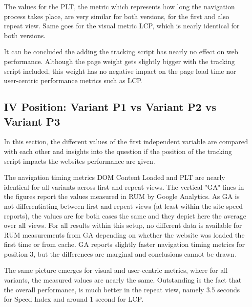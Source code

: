 
The values for the PLT, the metric which represents how long the navigation process takes place, are very similar for both versions, for the first and also repeat view.
Same goes for the visual metric LCP, which is nearly identical for both versions.



It can be concluded the adding the tracking script has nearly no effect on web performance.
Although the page weight gets slightly bigger with the tracking script included, this weight has no negative impact on the page load time nor user-centric performance metrics such as LCP.



\subsection{IV Position: Variant P1 vs Variant P2 vs Variant P3}

In this section, the different values of the first independent variable are compared with each other and insights into the question if the position of the tracking script impacts the websites performance are given.


The navigation timing metrics DOM Content Loaded and PLT are nearly identical for all variants across first and repeat views.
The vertical "GA" lines in the figures report the values measured in RUM by Google Analytics.
As GA is not differentiating between first and repeat views (at least within the site speed reports), the values are for both cases the same and they depict here the average over all views.
For all results within this setup, no different data is available for RUM measurements from GA depending on whether the website was loaded the first time or from cache.
GA reports slightly faster navigation timing metrics for position 3, but the differences are marginal and conclusions cannot be drawn.


The same picture emerges for visual and user-centric metrics, where for all variants, the measured values are nearly the same.
Outstanding is the fact that the overall performance, is much better in the repeat view, namely 3.5 seconds for Speed Index and around 1 second for LCP.

